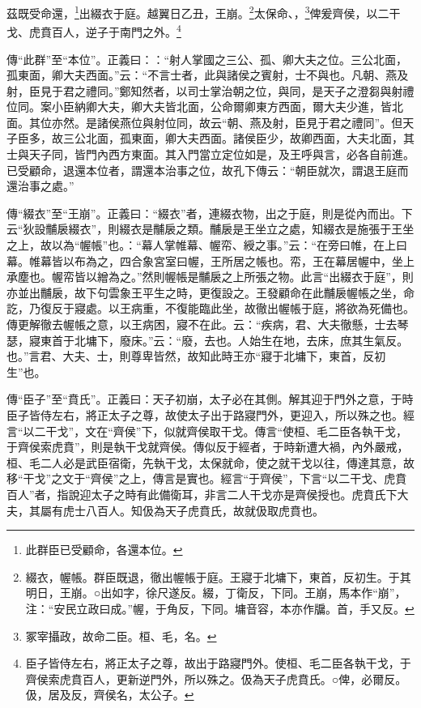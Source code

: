 茲既受命還，\footnote{此群臣已受顧命，各還本位。}出綴衣于庭。越翼日乙丑，王崩。\footnote{綴衣，幄帳。群臣既退，徹出幄帳于庭。王寢于北墉下，東首，反初生。于其明日，王崩。○出如字，徐尺遂反。綴，丁衛反，下同。王崩，馬本作“崩”，注：“安民立政曰成。”幄，于角反，下同。墉音容，本亦作牖。首，手又反。}太保命、，\footnote{冢宰攝政，故命二臣。桓、毛，名。}俾爰齊侯，以二干戈、虎賁百人，逆子于南門之外。\footnote{臣子皆侍左右，將正太子之尊，故出于路寢門外。使桓、毛二臣各執干戈，于齊侯索虎賁百人，更新逆門外，所以殊之。伋為天子虎賁氏。○俾，必爾反。伋，居及反，齊侯名，太公子。}


{\noindent\zhuan{}\fzbyks 傳“此群”至“本位”。正義曰：：“射人掌國之三公、孤、卿大夫之位。三公北面，孤東面，卿大夫西面。”云：“不言士者，此與諸侯之賓射，士不與也。凡朝、燕及射，臣見于君之禮同。”鄭知然者，以司士掌治朝之位，與同，是天子之澄芻與射禮位同。案小臣納卿大夫，卿大夫皆北面，公命爾卿東方西面，爾大夫少進，皆北面。其位亦然。是諸侯燕位與射位同，故云“朝、燕及射，臣見于君之禮同”。但天子臣多，故三公北面，孤東面，卿大夫西面。諸侯臣少，故卿西面，大夫北面，其士與天子同，皆門內西方東面。其入門當立定位如是，及王呼與言，必各自前進。已受顧命，退還本位者，謂還本治事之位，故孔下傳云：“朝臣就次，謂退王庭而還治事之處。” \par}

{\noindent\zhuan{}\fzbyks 傳“綴衣”至“王崩”。正義曰：“綴衣”者，連綴衣物，出之于庭，則是從內而出。下云“狄設黼扆綴衣”，則綴衣是黼扆之類。黼扆是王坐立之處，知綴衣是施張于王坐之上，故以為“幄帳”也。：“幕人掌帷幕、幄帟、綬之事。”云：“在旁曰帷，在上曰幕。帷幕皆以布為之，四合象宮室曰幄，王所居之帳也。帟，王在幕居幄中，坐上承塵也。幄帟皆以繒為之。”然則幄帳是黼扆之上所張之物。此言“出綴衣于庭”，則亦並出黼扆，故下句雲象王平生之時，更復設之。王發顧命在此黼扆幄帳之坐，命訖，乃復反于寢處。以王病重，不復能臨此坐，故徹出幄帳于庭，將欲為死備也。傳更解徹去幄帳之意，以王病困，寢不在此。云：“疾病，君、大夫徹懸，士去琴瑟，寢東首于北墉下，廢床。”云：“廢，去也。人始生在地，去床，庶其生氣反。也。”言君、大夫、士，則尊卑皆然，故知此時王亦“寢于北墉下，東首，反初生”也。 \par}

{\noindent\zhuan{}\fzbyks 傳“臣子”至“賁氏”。正義曰：天子初崩，太子必在其側。解其迎于門外之意，于時臣子皆侍左右，將正太子之尊，故使太子出于路寢門外，更迎入，所以殊之也。經言“以二干戈”，文在“齊侯”下，似就齊侯取干戈。傳言“使桓、毛二臣各執干戈，于齊侯索虎賁”，則是執干戈就齊侯。傳似反于經者，于時新遭大禍，內外嚴戒，桓、毛二人必是武臣宿衛，先執干戈，太保就命，使之就干戈以往，傳達其意，故移“干戈”之文于“齊侯”之上，傳言是實也。經言“于齊侯”，下言“以二干戈、虎賁百人”者，指說迎太子之時有此備衛耳，非言二人干戈亦是齊侯授也。虎賁氏下大夫，其屬有虎士八百人。知伋為天子虎賁氏，故就伋取虎賁也。 \par}

